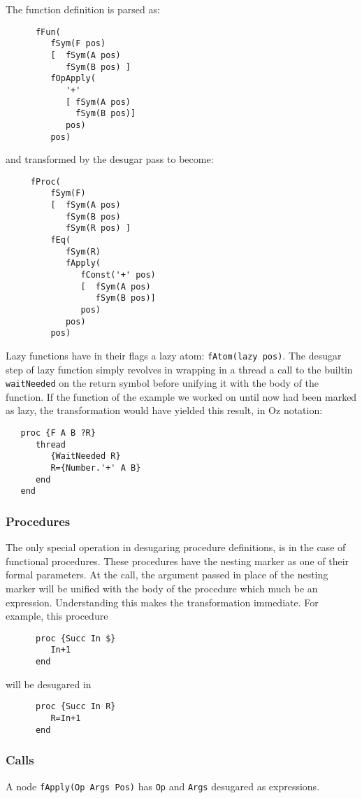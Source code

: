 \documentclass[a4paper]{memoir}
\begin{document}
The function definition is parsed as:
\begin{verbatim}
      fFun(
         fSym(F pos)
         [  fSym(A pos)
            fSym(B pos) ]
         fOpApply(
            '+'
            [ fSym(A pos)
              fSym(B pos)]
            pos)
         pos)
\end{verbatim}
and transformed by the desugar pass to become:
\begin{verbatim}
     fProc(     
         fSym(F)
         [  fSym(A pos)
            fSym(B pos)
            fSym(R pos) ]
         fEq(
            fSym(R)
            fApply(
               fConst('+' pos)
               [  fSym(A pos)
                  fSym(B pos)]
               pos)
            pos)
         pos)
\end{verbatim}


Lazy functions have in their flags a lazy atom: \lstinline!fAtom(lazy pos)!.
The desugar step of lazy function simply revolves in wrapping in a thread a call to the builtin \lstinline!waitNeeded! on the return symbol before unifying it with the body of the function. If the function of the example we worked on until now had been marked as lazy, the transformation would have yielded this result, in Oz notation:
\begin{lstlisting}
   proc {F A B ?R}
      thread 
         {WaitNeeded R}
         R={Number.'+' A B}
      end
   end
\end{lstlisting} 

\subsubsection{Procedures}\label{sec:arch:desugar:procedures}
The only special operation in desugaring procedure definitions, is in the case
of functional procedures. These procedures have the nesting marker as one of
their formal parameters. At the call, the argument passed in place of the
nesting marker will be unified with the body of the procedure which much be an
expression. 
Understanding this makes the transformation immediate. For example, this procedure
\begin{lstlisting}
      proc {Succ In $}
         In+1
      end
\end{lstlisting}

will be desugared in

\begin{lstlisting}
      proc {Succ In R}
         R=In+1
      end
\end{lstlisting}
\subsubsection{Calls}\label{sec:arch:desugar:calls}
A node \lstinline!fApply(Op Args Pos)! has \lstinline!Op! and \lstinline!Args!
desugared as expressions.
\end{document}
